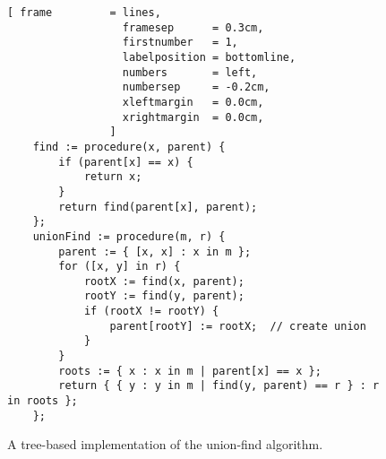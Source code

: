 \begin{figure}[!ht]
\centering
\begin{Verbatim}[ frame         = lines, 
                  framesep      = 0.3cm, 
                  firstnumber   = 1,
                  labelposition = bottomline,
                  numbers       = left,
                  numbersep     = -0.2cm,
                  xleftmargin   = 0.0cm,
                  xrightmargin  = 0.0cm,
                ]
    find := procedure(x, parent) {
        if (parent[x] == x) {
            return x;
        }
        return find(parent[x], parent);
    };
    unionFind := procedure(m, r) {
        parent := { [x, x] : x in m };  
        for ([x, y] in r) {
            rootX := find(x, parent);
            rootY := find(y, parent);
            if (rootX != rootY) {
                parent[rootY] := rootX;  // create union
            }
        }
        roots := { x : x in m | parent[x] == x };
        return { { y : y in m | find(y, parent) == r } : r in roots };
    };
\end{Verbatim}
\vspace*{-0.3cm}
\caption{A tree-based implementation of the union-find algorithm.}
\label{fig:union-find-tree.stlx}
\end{figure}

